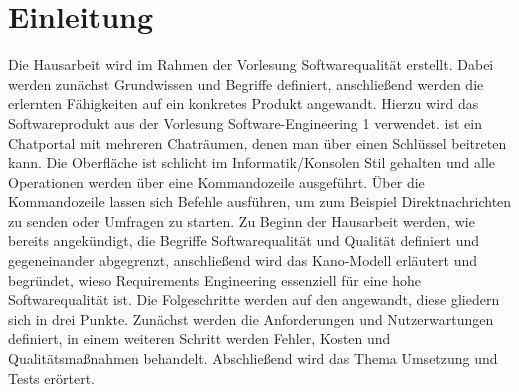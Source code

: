 \section{Einleitung}
Die Hausarbeit wird im Rahmen der Vorlesung Softwarequalität erstellt.
Dabei werden zunächst Grundwissen und Begriffe definiert, anschließend werden die erlernten Fähigkeiten auf ein konkretes Produkt angewandt.
Hierzu wird das Softwareprodukt  aus der Vorlesung Software-Engineering 1 verwendet.
\newparagraph
 ist ein Chatportal mit mehreren Chaträumen, denen man über einen Schlüssel beitreten kann.
Die Oberfläche ist schlicht im Informatik/Konsolen Stil gehalten und alle Operationen werden über eine Kommandozeile ausgeführt.
Über die Kommandozeile lassen sich Befehle ausführen, um zum Beispiel Direktnachrichten zu senden oder Umfragen zu starten.
\newparagraph
Zu Beginn der Hausarbeit werden, wie bereits angekündigt, die Begriffe Softwarequalität und Qualität definiert und gegeneinander abgegrenzt, anschließend wird das Kano-Modell erläutert und begründet, wieso Requirements Engineering essenziell für eine hohe Softwarequalität ist.
Die Folgeschritte werden auf den  angewandt, diese gliedern sich in drei Punkte.
Zunächst werden die Anforderungen und Nutzerwartungen definiert, in einem weiteren Schritt werden Fehler, Kosten und Qualitätsmaßnahmen behandelt.
Abschließend wird das Thema Umsetzung und Tests erörtert.